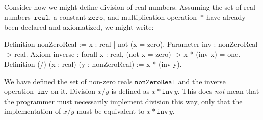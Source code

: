 Consider how we might define division of real numbers. Assuming the
set of real numbers~$\mathtt{real}$, a constant $\mathtt{zero}$, and
multiplication operation~$\mathtt{*}$ have already been declared and
axiomatized, we might write:
%
\begin{source}
Definition nonZeroReal := {x : real | not (x = zero)}.
Parameter inv : nonZeroReal -> real.
Axiom inverse : forall x : real, (not x = zero) -> x * (inv x) = one.
Definition (/) (x : real) (y : nonZeroReal) := x * (inv y).
\end{source}
%
We have defined the set of non-zero reals $\mathtt{nonZeroReal}$ and
the inverse operation~$\mathtt{inv}$ on it. Division $x/y$ is defined
as $x * \mathtt{inv}\,y$. This does \emph{not} mean that the
programmer must necessarily implement division this way, only that the
implementation of $x/y$ must be equivalent to $x * \mathtt{inv}\,y$.

